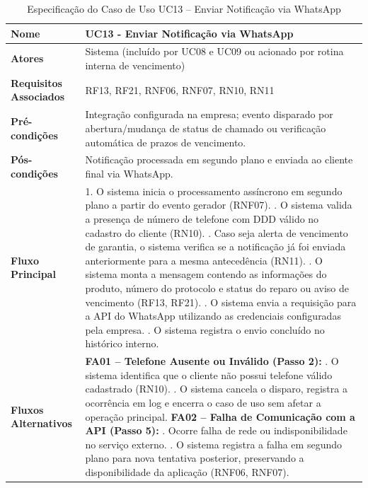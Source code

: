 \begin{table}[H]
	\centering
	\caption{Especificação do Caso de Uso UC13 – Enviar Notificação via WhatsApp}
	\label{tab:uc13}
	\begin{tabular}{|p{3.5cm}|p{11.5cm}|}
		\hline
		\textbf{Nome} & UC13 - Enviar Notificação via WhatsApp \\ \hline
		\textbf{Atores} & Sistema (incluído por UC08 e UC09 ou acionado por rotina interna de vencimento) \\ \hline
		\textbf{Requisitos Associados} & RF13, RF21, RNF06, RNF07, RN10, RN11 \\ \hline
		\textbf{Pré-condições} & Integração configurada na empresa; evento disparado por abertura/mudança de status de chamado ou verificação automática de prazos de vencimento. \\ \hline
		\textbf{Pós-condições} & Notificação processada em segundo plano e enviada ao cliente final via WhatsApp. \\ \hline
		\textbf{Fluxo Principal} & 
		1. O sistema inicia o processamento assíncrono em segundo plano a partir do evento gerador (RNF07). \newline
		2. O sistema valida a presença de número de telefone com DDD válido no cadastro do cliente (RN10). \newline
		3. Caso seja alerta de vencimento de garantia, o sistema verifica se a notificação já foi enviada anteriormente para a mesma antecedência (RN11). \newline
		4. O sistema monta a mensagem contendo as informações do produto, número do protocolo e status do reparo ou aviso de vencimento (RF13, RF21). \newline
		5. O sistema envia a requisição para a API do WhatsApp utilizando as credenciais configuradas pela empresa. \newline
		6. O sistema registra o envio concluído no histórico interno. \\ \hline
		\textbf{Fluxos Alternativos} & 
		\textbf{FA01 – Telefone Ausente ou Inválido (Passo 2):} \newline
		1. O sistema identifica que o cliente não possui telefone válido cadastrado (RN10). \newline
		2. O sistema cancela o disparo, registra a ocorrência em log e encerra o caso de uso sem afetar a operação principal. \newline
		\textbf{FA02 – Falha de Comunicação com a API (Passo 5):} \newline
		1. Ocorre falha de rede ou indisponibilidade no serviço externo. \newline
		2. O sistema registra a falha em segundo plano para nova tentativa posterior, preservando a disponibilidade da aplicação (RNF06, RNF07). \\ \hline
	\end{tabular}
\end{table}

